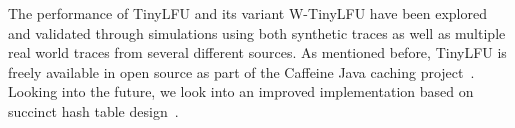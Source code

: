 \documentclass[10pt,a4paper]{article}
\begin{document}
The performance of TinyLFU and its variant W-TinyLFU have been explored and validated through simulations using both synthetic traces as well as multiple real world traces from several different sources.
As mentioned before, TinyLFU is freely available in open source as part of the Caffeine Java caching project~\cite{CaffeineProject}.
Looking into the future, we look into an improved implementation based on succinct hash table design~\cite{TinyTable,TinySet}.

{



}
\end{document}

